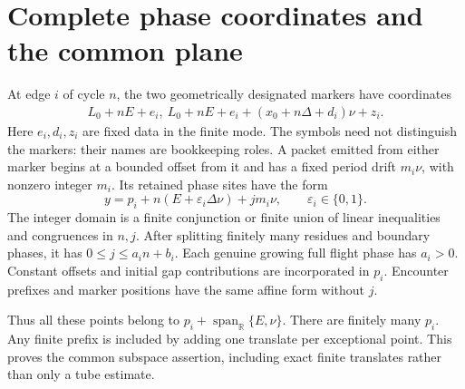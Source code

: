 \documentclass[11pt,letterpaper]{article}
\numberwithin{equation}{section}
\theoremstyle{definition}
\theoremstyle{remark}
\newcommand{\R}{\mathbb R}
\begin{document}
\section{Complete phase coordinates and the common plane}\label{smc:og:sec:phase}
At edge $i$ of cycle $n$, the two geometrically designated markers have coordinates
\begin{align*}
 L_0+nE+e_i,\
 L_0+nE+e_i+(x_0+n\Delta+d_i)\nu+z_i.
\end{align*}
Here $e_i,d_i,z_i$ are fixed data in the finite mode. The symbols need not distinguish the markers: their names are bookkeeping roles. A packet emitted from either marker begins at a bounded offset from it and has a fixed period drift $m_i\nu$, with nonzero integer $m_i$. Its retained phase sites have the form
\begin{equation}\label{smc:og:eq:phase}
 y=p_i+n(E+\varepsilon_i\Delta\nu)+j m_i\nu,
 \qquad \varepsilon_i\in\{0,1\}.
\end{equation}
The integer domain is a finite conjunction or finite union of linear inequalities and congruences in $n,j$. After splitting finitely many residues and boundary phases, it has $0\le j\le a_i n+b_i$. Each genuine growing full flight phase has $a_i>0$. Constant offsets and initial gap contributions are incorporated in $p_i$. Encounter prefixes and marker positions have the same affine form without $j$.

Thus all these points belong to $p_i+\operatorname{span}_{\R}\{E,\nu\}$. There are finitely many $p_i$. Any finite prefix is included by adding one translate per exceptional point. This proves the common subspace assertion, including exact finite translates rather than only a tube estimate.
\end{document}
